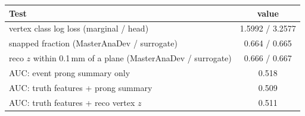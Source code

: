 \begin{tabular}{lc}
\toprule
Test & value \\
\midrule
vertex class log loss (marginal / head) & 1.5992 / 3.2577 \\
snapped fraction (MasterAnaDev / surrogate) & 0.664 / 0.665 \\
reco $z$ within 0.1\,mm of a plane (MasterAnaDev / surrogate) & 0.666 / 0.667 \\
\midrule
AUC: event prong summary only & 0.518 \\
AUC: truth features + prong summary & 0.509 \\
AUC: truth features + reco vertex $z$ & 0.511 \\
\bottomrule
\end{tabular}

